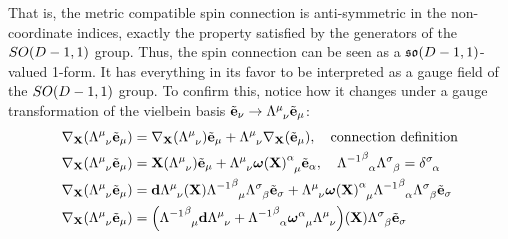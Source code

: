 That is, the metric compatible spin connection is anti-symmetric in the non-coordinate indices, exactly the property 
satisfied by the generators of the $SO\qty(D-1,1)$ group. Thus, the spin connection can be seen as a $\mathfrak{so}\qty(D-1,1)$-valued 1-form. It has 
everything in its favor to be interpreted as a gauge field of the $SO\qty(D-1,1)$ group. To confirm this, notice how it changes under a gauge transformation 
of the vielbein basis $\tilde{\vb e}_\nu\rightarrow\tensor{\Lambda}{^\mu_\nu}\tilde{\vb e}_\mu$:
\begin{align*}
    \nabla_{\vb X}\qty(\tensor{\Lambda}{^\mu_\nu}\tilde{\vb e}_\mu)&=\nabla_{\vb X }\qty(\tensor{\Lambda}{^\mu_\nu})\tilde{\vb e}_\mu+\tensor{\Lambda}{^\mu_\nu}\nabla_{\vb X}\qty(\tilde{\vb e}_\mu),\ \ \ \textnormal{connection definition}\\
    \nabla_{\vb X}\qty(\tensor{\Lambda}{^\mu_\nu}\tilde{\vb e}_\mu)&=\vb X\qty(\tensor{\Lambda}{^\mu_\nu})\tilde{\vb e}_\mu+\tensor{\Lambda}{^\mu_\nu}\tensor{{\boldsymbol\omega\qty(\vb X)}}{^\alpha_\mu}\tilde{\vb e}_\alpha,\ \ \ \tensor{{\Lambda^{-1}}}{^\beta_\alpha}\tensor{\Lambda}{^\sigma_\beta}=\tensor{\delta}{^\sigma_\alpha}\\
    \nabla_{\vb X}\qty(\tensor{\Lambda}{^\mu_\nu}\tilde{\vb e}_\mu)&=\vb d\tensor{\Lambda}{^\mu_\nu}\qty(\vb X)\tensor{{\Lambda^{-1}}}{^\beta_\mu}\tensor{\Lambda}{^\sigma_\beta}\tilde{\vb e}_\sigma+\tensor{\Lambda}{^\mu_\nu}\tensor{{\boldsymbol\omega\qty(\vb X)}}{^\alpha_\mu}\tensor{{\Lambda^{-1}}}{^\beta_\alpha}\tensor{\Lambda}{^\sigma_\beta}\tilde{\vb e}_\sigma\\
    \nabla_{\vb X}\qty(\tensor{\Lambda}{^\mu_\nu}\tilde{\vb e}_\mu)&=\qty(\tensor{{\Lambda^{-1}}}{^\beta_\mu}\vb d{\tensor{\Lambda}{^\mu_\nu}}+\tensor{{\Lambda^{-1}}}{^\beta_\alpha}\tensor{{\boldsymbol\omega}}{^\alpha_\mu}\tensor{\Lambda}{^\mu_\nu})\qty(\vb X)\tensor{\Lambda}{^\sigma_\beta}\tilde{\vb e}_\sigma
\end{align*}

